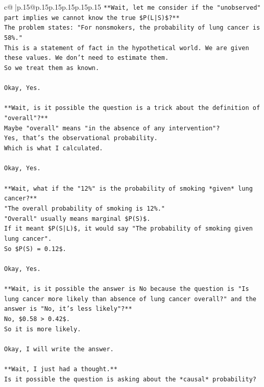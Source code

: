 \documentclass{article}
\begin{document}
{\begin{supertabular}{c@{$\;$}|p{.15\linewidth}@{}p{.15\linewidth}p{.15\linewidth}p{.15\linewidth}p{.15\linewidth}p{.15\linewidth}}
{{{\texttt{**Wait, let me consider if the "unobserved" part implies we cannot know the true \$P(L|S)\$?**} \\
\texttt{The problem states: "For nonsmokers, the probability of lung cancer is 58\%."} \\
\texttt{This is a statement of fact in the hypothetical world. We are given these values. We don't need to estimate them.} \\
\texttt{So we treat them as known.} \\
\\ 
\texttt{Okay, Yes.} \\
\\ 
\texttt{**Wait, is it possible the question is a trick about the definition of "overall"?**} \\
\texttt{Maybe "overall" means "in the absence of any intervention"?} \\
\texttt{Yes, that's the observational probability.} \\
\texttt{Which is what I calculated.} \\
\\ 
\texttt{Okay, Yes.} \\
\\ 
\texttt{**Wait, what if the "12\%" is the probability of smoking *given* lung cancer?**} \\
\texttt{"The overall probability of smoking is 12\%."} \\
\texttt{"Overall" usually means marginal \$P(S)\$.} \\
\texttt{If it meant \$P(S|L)\$, it would say "The probability of smoking given lung cancer".} \\
\texttt{So \$P(S) = 0.12\$.} \\
\\ 
\texttt{Okay, Yes.} \\
\\ 
\texttt{**Wait, is it possible the answer is No because the question is "Is lung cancer more likely than absence of lung cancer overall?" and the answer is "No, it's less likely"?**} \\
\texttt{No, \$0.58 > 0.42\$.} \\
\texttt{So it is more likely.} \\
\\ 
\texttt{Okay, I will write the answer.} \\
\\ 
\texttt{**Wait, I just had a thought.**} \\
\texttt{Is it possible the question is asking about the *causal* probability?} \\
}}}
\end{supertabular}}
\end{document}
